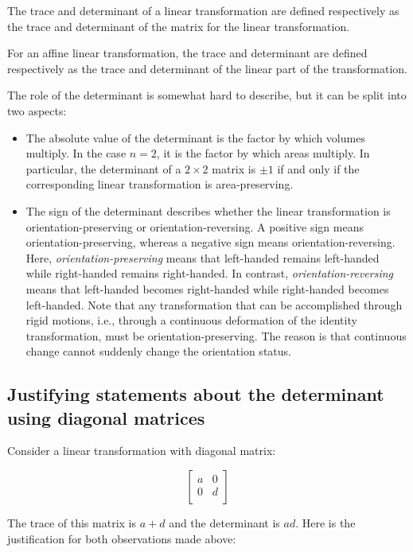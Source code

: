 \documentclass[10pt]{amsart}
\begin{document}
The trace and determinant of a linear transformation are defined
respectively as the trace and determinant of the matrix for the linear
transformation.

For an affine linear transformation, the trace and determinant are
defined respectively as the trace and determinant of the linear part
of the transformation.

The role of the determinant is somewhat hard to describe, but it can
be split into two aspects:

\begin{itemize}
\item The absolute value of the determinant is the factor by which
  volumes multiply. In the case $n = 2$, it is the factor by which
  areas multiply. In particular, the determinant of a $2 \times 2$
  matrix is $\pm 1$ if and only if the corresponding linear
  transformation is area-preserving.
\item The sign of the determinant describes whether the linear
  transformation is orientation-preserving or orientation-reversing. A
  positive sign means orientation-preserving, whereas a negative sign
  means orientation-reversing. Here, {\em orientation-preserving}
  means that left-handed remains left-handed while right-handed
  remains right-handed. In contrast, {\em orientation-reversing} means
  that left-handed becomes right-handed while right-handed becomes
  left-handed. Note that any transformation that can be accomplished
  through rigid motions, i.e., through a continuous deformation of the
  identity transformation, must be orientation-preserving. The reason
  is that continuous change cannot suddenly change the orientation
  status.
\end{itemize}

\subsection{Justifying statements about the determinant using diagonal matrices}

Consider a linear transformation with diagonal matrix:

$$\left[\begin{matrix} a & 0 \\ 0 & d \\\end{matrix}\right]$$

The trace of this matrix is $a + d$ and the determinant is $ad$. Here
is the justification for both observations made above:
\end{document}
